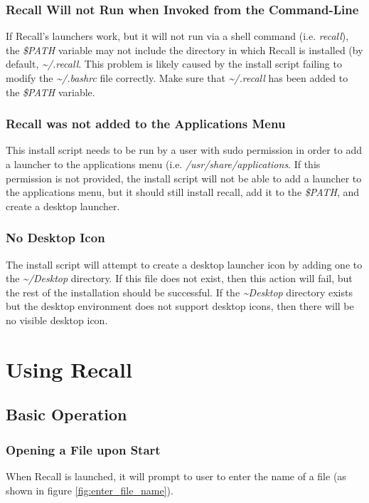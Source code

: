 \documentclass[letterpaper]{article}
\begin{document}
\subsubsection{Recall Will not Run when Invoked from the Command-Line}
If Recall's launchers work, but it will not run via a shell command (i.e. \textit{recall}), the \textit{\$PATH} variable may not include the directory in which Recall is installed (by default, \textit{\~{}/.recall}. This problem is likely caused by the install script failing to modify the \textit{\~{}/.bashrc} file correctly. Make sure that \textit{\~{}/.recall} has been added to the \textit{\$PATH} variable.

\subsubsection{Recall was not added to the Applications Menu}
This install script needs to be run by a user with sudo permission in order to add a launcher to the applications menu (i.e. \textit{/usr/share/applications}. If this permission is not provided, the install script will not be able to add a launcher to the applications menu, but it should still install recall, add it to the \textit{\$PATH}, and create a desktop launcher.

\subsubsection{No Desktop Icon}
The install script will attempt to create a desktop launcher icon by adding one to the \textit{\~{}/Desktop} directory. If this file does not exist, then this action will fail, but the rest of the installation should be successful. If the \textit{\~{}Desktop} directory exists but the desktop environment does not support desktop icons, then there will be no visible desktop icon.

\section{Using Recall}
\subsection{Basic Operation}
\subsubsection{Opening a File upon Start} \label{opening a file}
When Recall is launched, it will prompt to user to enter the name of a file (as shown in figure \ref{fig:enter_file_name}).
\end{document}
